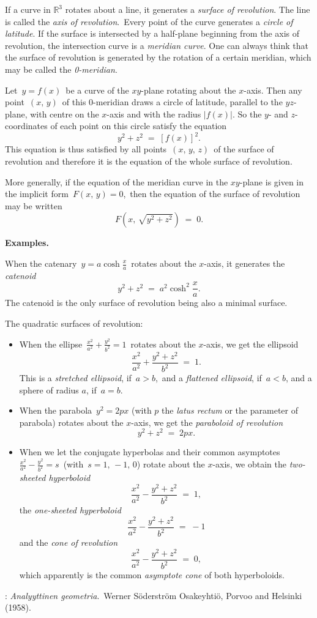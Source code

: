 \documentclass[12pt]{article}
\theoremstyle{definition}
\begin{document}
If a curve in $\mathbb{R}^3$ rotates about a line, it generates a {\em surface of revolution}.  The line is called the {\em axis of revolution}.\, Every point of the curve generates a {\em circle of latitude}.  If the surface is intersected by a half-plane beginning from the axis of revolution, the intersection curve is a {\em meridian curve}.  One can always think that the surface of revolution is generated by the rotation of a certain meridian, which may be called the {\em 0-meridian}.

Let\, $y = f(x)$\, be a curve of the $xy$-plane rotating about the $x$-axis.  Then any point \,$(x,\,y)$\, of this 0-meridian draws a circle of latitude, parallel to the $yz$-plane, with centre on the $x$-axis and with the radius $|f(x)|$.  So the $y$- and $z$-coordinates of each point on this circle satisfy the equation
                    $$y^2\!+\!z^2 \;=\; [f(x)]^2.$$
This equation is thus satisfied by all points\, $(x,\,y,\,z)$\, of the surface of revolution and therefore it is the equation of the whole surface of revolution.

More generally, if the equation of the meridian curve in the $xy$-plane is given in the implicit form 
\,$F(x,\,y) = 0$,\, then the equation of the surface of revolution may be written
$$F(x,\,\sqrt{y^2\!+\!z^2}) \;=\; 0.$$

\textbf{Examples.}

When the catenary \,$y = a\cosh\frac{x}{a}$\, rotates about the $x$-axis, it generates the {\em catenoid}
$$y^2\!+\!z^2 \;=\; a^2\cosh^2\frac{x}{a}.$$
The catenoid is the only surface of revolution being also a minimal surface.

The quadratic surfaces of revolution:
\begin{itemize}
\item When the ellipse \,$\displaystyle\frac{x^2}{a^2}+\frac{y^2}{b^2} = 1$\, rotates about the $x$-axis, we get the ellipsoid
$$\frac{x^2}{a^2}+\frac{y^2\!+\!z^2}{b^2} \;=\; 1.$$
This is a {\em stretched ellipsoid}, if\, $a > b$,\, and a {\em flattened ellipsoid}, if\, $a < b$, and a sphere of radius $a$, if\, $a = b$.
\item When the parabola \,$y^2 = 2px$ (with $p$ the {\em latus rectum} or the parameter of parabola) rotates about the $x$-axis, we get the {\em paraboloid of revolution}
$$y^2\!+\!z^2 \;=\; 2px.$$
\item When we let the conjugate hyperbolas and their common asymptotes 
\,$\displaystyle\frac{x^2}{a^2}-\frac{y^2}{b^2} = s$\, (with\, $s = 1,\,-1,\,0$) rotate about the $x$-axis, we obtain the {\em two-sheeted hyperboloid}
$$\frac{x^2}{a^2}-\frac{y^2\!+\!z^2}{b^2} \;=\; 1,$$
the {\em one-sheeted hyperboloid}
$$\frac{x^2}{a^2}-\frac{y^2\!+\!z^2}{b^2} \;=\; -1$$
and the {\em cone of revolution}
$$\frac{x^2}{a^2}-\frac{y^2\!+\!z^2}{b^2} \;=\; 0,$$ 
which apparently is the common {\em asymptote cone} of both hyperboloids.
\end{itemize}


\begin{thebibliography}{8}
: {\em Analyyttinen geometria}.\, Werner S\"oderstr\"om Osakeyhti\"o, Porvoo and Helsinki (1958).
\end{thebibliography} 

\end{document}
